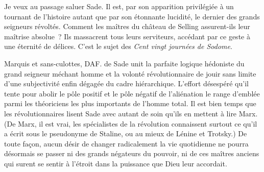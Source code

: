 \documentclass[french,twoside]{book} %
\begin{document}
Je veux au passage saluer Sade. Il est, par son apparition privilégiée à un tournant de l’histoire autant que par son étonnante lucidité, le dernier des grands seigneurs révoltés. Comment les maîtres du château de Selling assurent-ils leur maîtrise absolue ? Ils massacrent tous leurs serviteurs, accédant par ce geste à une éternité de délices. C’est le sujet des \emph{Cent vingt journées de Sodome}.\par
Marquis et sans-culottes, DAF. de Sade unit la parfaite logique hédoniste du grand seigneur méchant homme et la volonté révolutionnaire de jouir sans limite d’une subjectivité enfin dégagée du cadre hiérarchique. L’effort désespéré qu’il tente pour abolir le pôle positif et le pôle négatif de l’aliénation le range d’emblée parmi les théoriciens les plus importants de l’homme total. Il est bien temps que les révolutionnaires lisent Sade avec autant de soin qu’ils en mettent à lire Marx. (De Marx, il est vrai, les spécialistes de la révolution connaissent surtout ce qu’il a écrit sous le pseudonyme de Staline, ou au mieux de Lénine et Trotsky.) De toute façon, aucun désir de changer radicalement la vie quotidienne ne pourra désormais se passer ni des grands négateurs du pouvoir, ni de ces maîtres anciens qui surent se sentir à l’étroit dans la puissance que Dieu leur accordait.
\end{document}
